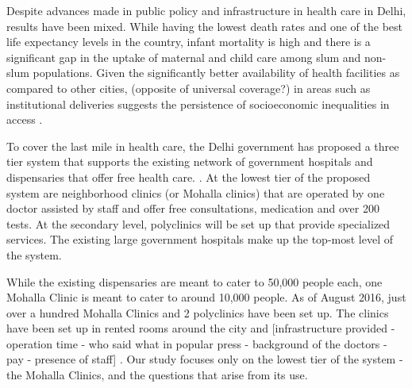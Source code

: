 Despite advances made in public policy and infrastructure in health care in Delhi, results have been mixed. While having the lowest death rates and one of the best life expectancy levels in the country, infant mortality is high and there is a significant gap in the uptake of maternal and child care among slum and non-slum populations. Given the significantly better availability of health facilities as compared to other cities, (opposite of universal coverage?) in areas such as institutional deliveries suggests the persistence of socioeconomic inequalities in access \cite{mazumdar2015health}.

To cover the last mile in health care, the Delhi government has proposed a three tier system that supports the existing network of government hospitals and dispensaries that offer free health care. \cite{article}. At the lowest tier of the proposed system are neighborhood clinics (or Mohalla clinics) that are operated by one doctor assisted by staff and offer free consultations, medication and over 200 tests. At the secondary level, polyclinics will be set up that provide specialized services. The existing large government hospitals make up the top-most level of the system.

While the existing dispensaries are meant to cater to 50,000 people each, one Mohalla Clinic is meant to cater to around 10,000 people. As of August 2016, just over a hundred Mohalla Clinics and 2 polyclinics have been set up. The clinics have been set up in rented rooms around the city and [infrastructure provided - operation time -  who said what in popular press - background of the doctors - pay - presence of staff] \cite{articles}. Our study focuses only on the lowest tier of the system - the Mohalla Clinics, and the questions that arise from its use.